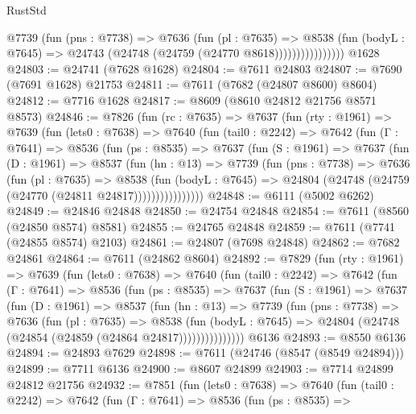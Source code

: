 \begin{lexlean}{RustStd}
\begin{coremodule}
                      @7739
                        (fun (pns : @7738) =>
                        @7636
                          (fun (pl : @7635) =>
                          @8538
                            (fun (bodyL : @7645) =>
                            @24743 (@24748 (@24759 (@24770 @8618))))))))))))))))
    @1628
@24803 := @24741 (@7628 @1628)
@24804 := @7611 @24803
@24807 := @7690 (@7691 @1628) @21753
@24811 := @7611 (@7682 (@24807 @8600) @8604)
@24812 := @7716 @1628
@24817 := @8609 (@8610 @24812 @21756 @8571 @8573)
@24846 := @7826
    (fun (rc : @7635) =>
    @7637
      (fun (rty : @1961) =>
      @7639
        (fun (lets0 : @7638) =>
        @7640
          (fun (tail0 : @2242) =>
          @7642
            (fun (Γ : @7641) =>
            @8536
              (fun (ps : @8535) =>
              @7637
                (fun (S : @1961) =>
                @7637
                  (fun (D : @1961) =>
                  @8537
                    (fun (hn : @13) =>
                    @7739
                      (fun (pns : @7738) =>
                      @7636
                        (fun (pl : @7635) =>
                        @8538
                          (fun (bodyL : @7645) =>
                          @24804 (@24748 (@24759 (@24770 (@24811 @24817))))))))))))))))
@24848 := @6111 (@5002 @6262)
@24849 := @24846 @24848
@24850 := @24754 @24848
@24854 := @7611 (@8560 (@24850 @8574) @8581)
@24855 := @24765 @24848
@24859 := @7611 (@7741 (@24855 @8574) @2103)
@24861 := @24807 (@7698 @24848)
@24862 := @7682 @24861
@24864 := @7611 (@24862 @8604)
@24892 := @7829
    (fun (rty : @1961) =>
    @7639
      (fun (lets0 : @7638) =>
      @7640
        (fun (tail0 : @2242) =>
        @7642
          (fun (Γ : @7641) =>
          @8536
            (fun (ps : @8535) =>
            @7637
              (fun (S : @1961) =>
              @7637
                (fun (D : @1961) =>
                @8537
                  (fun (hn : @13) =>
                  @7739
                    (fun (pns : @7738) =>
                    @7636
                      (fun (pl : @7635) =>
                      @8538
                        (fun (bodyL : @7645) =>
                        @24804 (@24748 (@24854 (@24859 (@24864 @24817)))))))))))))))
    @6136
@24893 := @8550 @6136
@24894 := @24893 @7629
@24898 := @7611 (@24746 (@8547 (@8549 @24894)))
@24899 := @7711 @6136
@24900 := @8607 @24899
@24903 := @7714 @24899 @24812 @21756
@24932 := @7851
    (fun (lets0 : @7638) =>
    @7640
      (fun (tail0 : @2242) =>
      @7642
        (fun (Γ : @7641) =>
        @8536
          (fun (ps : @8535) =>

\end{coremodule}
\end{lexlean}
